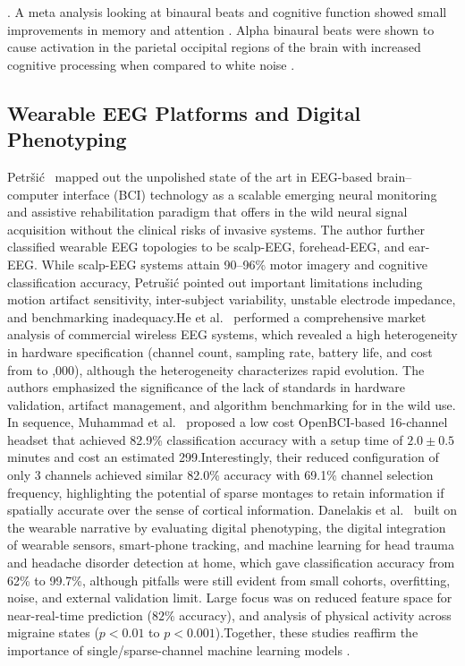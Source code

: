 \documentclass[12pt, a4paper]{report}
\begin{document}
\cite{WangZhang2022}. A meta analysis looking at binaural beats and cognitive function showed small improvements in memory and attention \cite{BasuBanerjee2023}. Alpha binaural beats were shown to cause activation in the parietal occipital regions of the brain with increased cognitive processing when compared to white noise \cite{Hamid2025}.
 

\subsection{Wearable EEG Platforms and Digital Phenotyping}
\label{subsec:lit_wearable_systems}
Petr\v{s}i\'{c}~\cite{Petrusic2025} mapped out the unpolished state of the art in EEG-based brain--computer interface (BCI) technology as a scalable emerging neural monitoring and assistive rehabilitation paradigm that offers in the wild neural signal acquisition without the clinical risks of invasive systems. The author further classified wearable EEG topologies to be scalp-EEG, forehead-EEG, and ear-EEG. While scalp-EEG systems attain 90--96\% motor imagery and cognitive classification accuracy, Petru\v{s}i\'{c} pointed out important limitations including motion artifact sensitivity, inter-subject variability, unstable electrode impedance, and benchmarking inadequacy.He et al.~\cite{He2023} performed a comprehensive market analysis of commercial wireless EEG systems, which revealed a high heterogeneity in hardware specification (channel count, sampling rate, battery life, and cost from  to ,000), although the heterogeneity characterizes rapid evolution. The authors emphasized the significance of the lack of standards in hardware validation, artifact management, and algorithm benchmarking for in the wild use. In sequence, Muhammad et al.~\cite{Muhammad2023} proposed a low cost OpenBCI-based 16-channel headset that achieved 82.9\% classification accuracy with a setup time of $2.0\pm 0.5$ minutes and cost an estimated \textdollar 299.Interestingly, their reduced configuration of only 3 channels achieved similar 82.0\% accuracy with 69.1\% channel selection frequency, highlighting the potential of sparse montages to retain information if spatially accurate over the sense of cortical information. Danelakis et al.~\cite{DanelakisStubberud2025} built on the wearable narrative by evaluating digital phenotyping, the digital integration of wearable sensors, smart-phone tracking, and machine learning for head trauma and headache disorder detection at home, which gave classification accuracy from 62\% to 99.7\%, although pitfalls were still evident from small cohorts, overfitting, noise, and external validation limit. Large focus was on reduced feature space for near-real-time prediction ($82\%$ accuracy), and analysis of physical activity across migraine states ($p < 0.01$ to $p < 0.001$).Together, these studies reaffirm the importance of single/sparse-channel machine learning models \cite{Petrusic2025,He2023,DanelakisStubberud2025}.
\end{document}
